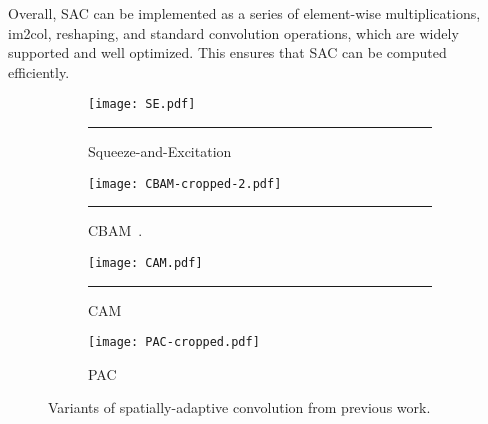 \documentclass[runningheads]{llncs}
\begin{document}
Overall, SAC can be implemented as a series of element-wise multiplications, im2col, reshaping, and standard convolution operations, which are widely supported and well optimized. This ensures that SAC can be computed efficiently. 


\begin{figure}[t!]
     \centering
     \begin{subfigure}[b]{0.75\textwidth}
         \centering
         \texttt{[image: SE.pdf]}
         \caption{ Squeeze-and-Excitation~\cite{hu2018squeeze}}
         \hrule
         \label{fig:SE}
     \end{subfigure}
     \hfill
          \begin{subfigure}[b]{0.75\textwidth}
         \centering
         \texttt{[image: CBAM-cropped-2.pdf]}
         \caption{CBAM~\cite{woo2018cbam}.}
         \hrule
         \label{fig:CBAM}
     \end{subfigure}
          \hfill
          \begin{subfigure}[b]{0.75\textwidth}
         \centering
         \texttt{[image: CAM.pdf]}
         \caption{CAM~\cite{wu2018squeezesegv2}}
         \hrule
         \label{fig:CAM}
     \end{subfigure}
               \hfill
          \begin{subfigure}[b]{0.75\textwidth}
         \centering
         \texttt{[image: PAC-cropped.pdf]}
         \caption{PAC~\cite{su2019pixel}}
         \label{fig:PAC}
     \end{subfigure}
     \hfill
     
    \caption{Variants of spatially-adaptive convolution from previous work.}
    \label{fig:others}
\end{figure}
\end{document}
